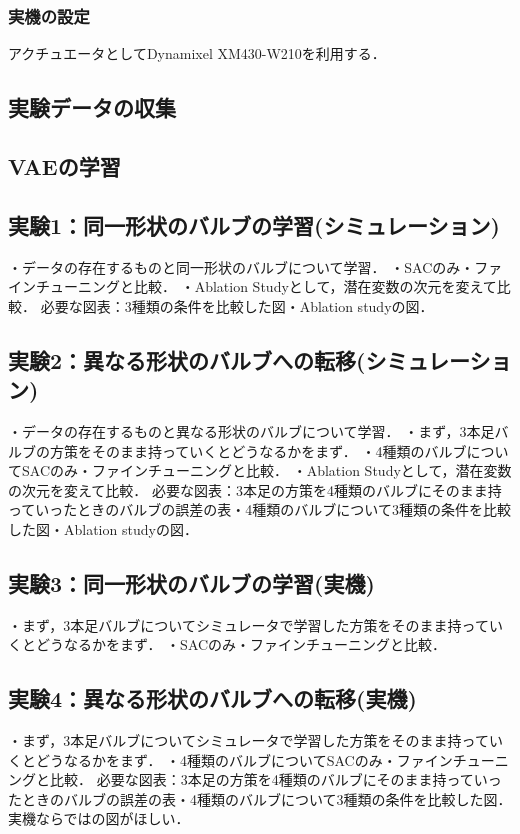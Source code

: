 \documentclass[dvipdfmx]{ampbt_nomag}
\begin{document}
\subsubsection{実機の設定}
アクチュエータとしてDynamixel XM430-W210を利用する．




\subsection{実験データの収集}
\subsection{VAEの学習}


\subsection{実験1：同一形状のバルブの学習(シミュレーション)}
・データの存在するものと同一形状のバルブについて学習．
・SACのみ・ファインチューニングと比較．
・Ablation Studyとして，潜在変数の次元を変えて比較．
必要な図表：3種類の条件を比較した図・Ablation studyの図．

\subsection{実験2：異なる形状のバルブへの転移(シミュレーション)}
・データの存在するものと異なる形状のバルブについて学習．
・まず，3本足バルブの方策をそのまま持っていくとどうなるかをまず．
・4種類のバルブについてSACのみ・ファインチューニングと比較．
・Ablation Studyとして，潜在変数の次元を変えて比較．
必要な図表：3本足の方策を4種類のバルブにそのまま持っていったときのバルブの誤差の表・4種類のバルブについて3種類の条件を比較した図・Ablation studyの図．

\subsection{実験3：同一形状のバルブの学習(実機)}
・まず，3本足バルブについてシミュレータで学習した方策をそのまま持っていくとどうなるかをまず．
・SACのみ・ファインチューニングと比較．

\subsection{実験4：異なる形状のバルブへの転移(実機)}
・まず，3本足バルブについてシミュレータで学習した方策をそのまま持っていくとどうなるかをまず．
・4種類のバルブについてSACのみ・ファインチューニングと比較．
必要な図表：3本足の方策を4種類のバルブにそのまま持っていったときのバルブの誤差の表・4種類のバルブについて3種類の条件を比較した図．
実機ならではの図がほしい．
\end{document}
